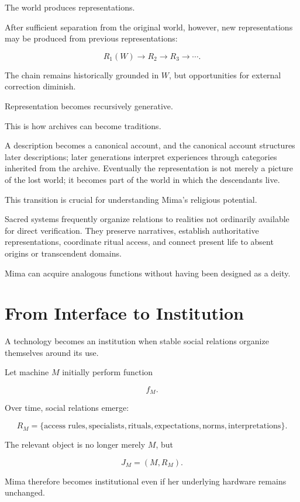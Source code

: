 \documentclass[11pt,oneside]{book}
\theoremstyle{definition}
\theoremstyle{remark}
\begin{document}
The world produces representations.

After sufficient separation from the original world, however, new representations may be produced from previous representations:

\[
R_1(W)
\rightarrow
R_2
\rightarrow
R_3
\rightarrow\cdots.
\]

The chain remains historically grounded in \(W\), but opportunities for external correction diminish.

Representation becomes recursively generative.

This is how archives can become traditions.

A description becomes a canonical account, and the canonical account structures later descriptions; later generations interpret experiences through categories inherited from the archive. Eventually the representation is not merely a picture of the lost world; it becomes part of the world in which the descendants live.

This transition is crucial for understanding Mima's religious potential.

Sacred systems frequently organize relations to realities not ordinarily available for direct verification. They preserve narratives, establish authoritative representations, coordinate ritual access, and connect present life to absent origins or transcendent domains.

Mima can acquire analogous functions without having been designed as a deity.

\section{From Interface to Institution}

A technology becomes an institution when stable social relations organize themselves around its use.

Let machine \(M\) initially perform function

\[
f_M.
\]

Over time, social relations emerge:

\[
R_M
=
\{
\text{access rules},
\text{specialists},
\text{rituals},
\text{expectations},
\text{norms},
\text{interpretations}
\}.
\]

The relevant object is no longer merely \(M\), but

\[
J_M
=
(M,R_M).
\]

Mima therefore becomes institutional even if her underlying hardware remains unchanged.
\end{document}
